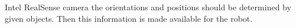 Intel RealSense camera the orientations and positions should be determined by given objects. Then
this information is made available for the robot.